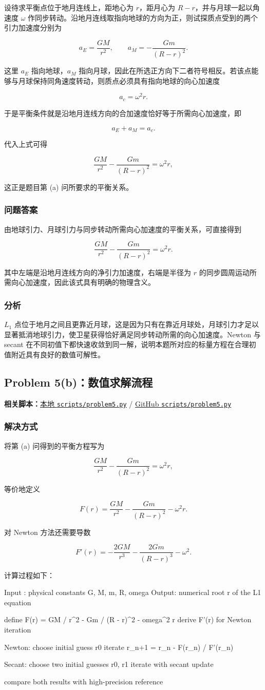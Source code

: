 \documentclass[12pt,a4paper,fontset=none]{ctexart}
\newcommand{\problem}[1]{\subsection{#1}}
\newcommand{\blocktitle}[1]{\subsubsection{#1}}
\newcommand{\fileinline}[1]{{\urlstyle{same}\nolinkurl{#1}}}
\newcommand{\scriptpath}[1]{\fileinline{#1}}
\newcommand{\githubscriptsbase}{https://github.com/Void0312Aurora/computational-physics-homework-2026/blob/main/04/scripts}
\newcommand{\scriptlink}[1]{\noindent\textbf{相关脚本：}\href{../../../scripts/#1}{本地 \scriptpath{scripts/#1}} / \href{\githubscriptsbase/#1}{GitHub \scriptpath{scripts/#1}}\par\medskip}
\begin{document}
设待求平衡点位于地月连线上，距地心为 \(r\)，距月心为 \(R-r\)，并与月球一起以角速度 \(\omega\) 作同步转动。沿地月连线取指向地球的方向为正，则试探质点受到的两个引力加速度分别为

\[
a_E=\frac{GM}{r^2},\qquad
a_M=-\frac{Gm}{(R-r)^2}.
\]

这里 \(a_E\) 指向地球，\(a_M\) 指向月球，因此在所选正方向下二者符号相反。若该点能够与月球保持同角速度转动，则质点必须具有指向地球的向心加速度

\[
a_c=\omega^2 r.
\]

于是平衡条件就是沿地月连线方向的合加速度恰好等于所需向心加速度，即

\[
a_E+a_M=a_c.
\]

代入上式可得

\[
\frac{GM}{r^2}-\frac{Gm}{(R-r)^2}=\omega^2r,
\]

这正是题目第 (a) 问所要求的平衡关系。

\blocktitle{问题答案}

由地球引力、月球引力与同步转动所需向心加速度的平衡关系，可直接得到

\[
\frac{GM}{r^2}-\frac{Gm}{(R-r)^2}=\omega^2r.
\]

其中左端是沿地月连线方向的净引力加速度，右端是半径为 \(r\) 的同步圆周运动所需向心加速度，因此该式具有明确的物理含义。

\blocktitle{分析}

\(L_1\) 点位于地月之间且更靠近月球，这是因为只有在靠近月球处，月球引力才足以显著抵消地球引力，使卫星获得恰好满足同步转动所需的向心加速度。Newton 与 secant 在不同初值下都快速收敛到同一解，说明本题所对应的标量方程在合理初值附近具有良好的数值可解性。

\problem{Problem 5(b)：数值求解流程}

\scriptlink{problem5.py}

\blocktitle{解决方式}

将第 (a) 问得到的平衡方程写为

\[
\frac{GM}{r^2}-\frac{Gm}{(R-r)^2}=\omega^2r,
\]

等价地定义

\[
F(r)=\frac{GM}{r^2}-\frac{Gm}{(R-r)^2}-\omega^2r.
\]

对 Newton 方法还需要导数

\[
F'(r)=-\frac{2GM}{r^3}-\frac{2Gm}{(R-r)^3}-\omega^2.
\]

计算过程如下：

\begin{CodeBlock}
Input : physical constants G, M, m, R, omega
Output: numerical root r of the L1 equation

define F(r) = GM / r^2 - Gm / (R - r)^2 - omega^2 r
derive F'(r) for Newton iteration

Newton:
    choose initial guess r0
    iterate r_{n+1} = r_n - F(r_n) / F'(r_n)

Secant:
    choose two initial guesses r0, r1
    iterate with secant update

compare both results with high-precision reference
\end{CodeBlock}
\end{document}
